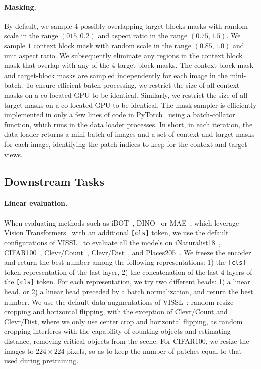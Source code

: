 \documentclass[10pt,twocolumn,letterpaper]{article}
\begin{document}
\paragraph{Masking.}
By default, we sample $4$ possibly overlapping target blocks masks with random scale in the range $(015, 0.2)$ and aspect ratio in the range $(0.75, 1.5)$.
We sample $1$ context block mask with random scale in the range $(0.85, 1.0)$ and unit aspect ratio.
We subsequently eliminate any regions in the context block mask that overlap with any of the $4$ target block masks.
The context-block mask and target-block masks are sampled independently for each image in the mini-batch.
To ensure efficient batch processing, we restrict the size of all context masks on a co-located GPU to be identical.
Similarly, we restrict the size of all target masks on a co-located GPU to be identical.
The mask-sampler is efficiently implemented in only a few lines of code in PyTorch~\cite{paszke2019pytorch} using a batch-collator function, which runs in the data loader processes.
In short, in each iteration, the data loader returns a mini-batch of images and a set of context and target masks for each image, identifying the patch indices to keep for the context and target views.

\subsection{Downstream Tasks}

\paragraph{Linear evaluation.}
When evaluating methods such as iBOT~\cite{zhou2021ibotyes}, DINO~\cite{caron2021emerging} or MAE~\cite{he2021masked}, which leverage Vision Transformers~\cite{dosovitskiy2020image} with an additional {\tt [cls]} token, we use the default configurations of VISSL~\cite{goyal2021vissl} to evaluate all the models on iNaturalist18~\cite{van2018inaturalist}, CIFAR100~\cite{krizhevsky2009learning}, Clevr/Count~\cite{johnson2017clevr, vtab}, Clevr/Dist~\cite{johnson2017clevr, vtab}, and Places205~\cite{zhou2014learning}.
We freeze the encoder and return the best number among the following representations: 1) the {\tt [cls]} token representation of the last layer, 2) the concatenation of the last $4$ layers of the {\tt [cls]} token.
For each representation, we try two different heads: 1) a linear head, or 2) a linear head preceded by a batch normalization, and return the best number.
We use the default data augmentations of VISSL~\cite{goyal2021vissl}: random resize cropping and horizontal flipping, with the exception of Clevr/Count and Clevr/Dist, where we only use center crop and horizontal flipping, as random cropping interferes with the capability of counting objects and estimating distance, removing critical objects from the scene.
For CIFAR100, we resize the images to $224 \times 224$ pixels, so as to keep the number of patches equal to that used during pretraining.
\end{document}

